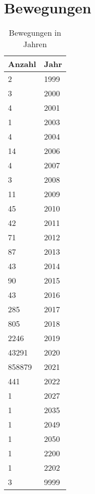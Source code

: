 \section{Bewegungen}
\begin{center}
 \begin{longtable}{|p{2.3cm}|p{2.5cm}|}
  \caption{Bewegungen in Jahren} \\
  \hline
\rowcolor{lightgray} Anzahl & Jahr \\ \hline
\endhead
2 & 1999 \\ \hline
3 & 2000 \\ \hline
4 & 2001 \\ \hline
1 & 2003 \\ \hline
4 & 2004 \\ \hline
14 & 2006 \\ \hline
4 & 2007 \\ \hline
3 & 2008 \\ \hline
11 & 2009 \\ \hline
45 & 2010 \\ \hline
42 & 2011 \\ \hline
71 & 2012 \\ \hline
87 & 2013 \\ \hline
43 & 2014 \\ \hline
90 & 2015 \\ \hline
43 & 2016 \\ \hline
285 & 2017 \\ \hline
805 & 2018 \\ \hline
2246 & 2019 \\ \hline
43291 & 2020 \\ \hline
858879 & 2021 \\ \hline
441 & 2022 \\ \hline
1 & 2027 \\ \hline
1 & 2035 \\ \hline
1 & 2049 \\ \hline
1 & 2050 \\ \hline
1 & 2200 \\ \hline
1 & 2202 \\ \hline
3 & 9999 \\ \hline
\end{longtable}
\end{center}
